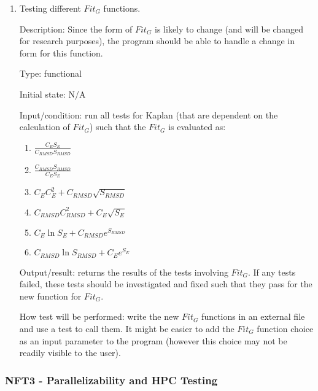 \documentclass[12pt, titlepage]{article}
\newcommand{\progname}{Kaplan} %
\begin{document}
\begin{enumerate}
	\item Testing different $Fit_G$ functions.
	
	Description: Since the form of $Fit_G$ is likely to change (and will be 
	changed for research purposes), the program should be able to handle a 
	change in form for this function.
	
	Type: functional
	
	Initial state: N/A
	
	Input/condition: run all tests for \progname{} (that are dependent on the 
	calculation of $Fit_G$) such that the $Fit_G$ is evaluated as:
	
	\begin{enumerate}
		\item $\frac{C_E S_E}{C_{RMSD} S_{RMSD}}$
		\item $\frac{C_{RMSD} S_{RMSD}}{C_E S_E}$
		\item $C_E C_E^2 + C_{RMSD}\sqrt{S_{RMSD}}$
		\item $C_{RMSD} C_{RMSD}^2 + C_E\sqrt{S_E}$
		\item $C_E\ln{S_E} + C_{RMSD} e^{S_{RMSD}}$
		\item $C_{RMSD}\ln{S_{RMSD}} + C_E e^{S_E}$
	\end{enumerate}

	Output/result: returns the results of the tests involving $Fit_G$. If any 
	tests failed, these tests should be investigated and fixed such that they 
	pass for the new function for $Fit_G$.
	
	How test will be performed: write the new $Fit_G$ functions in an external 
	file and use a test to call them. It might be easier to add the $Fit_G$ 
	function choice as an input parameter to the program (however this choice 
	may not be readily visible to the user).
	
\end{enumerate}

\subsubsection{NFT3 - Parallelizability and HPC Testing}
\end{document}
